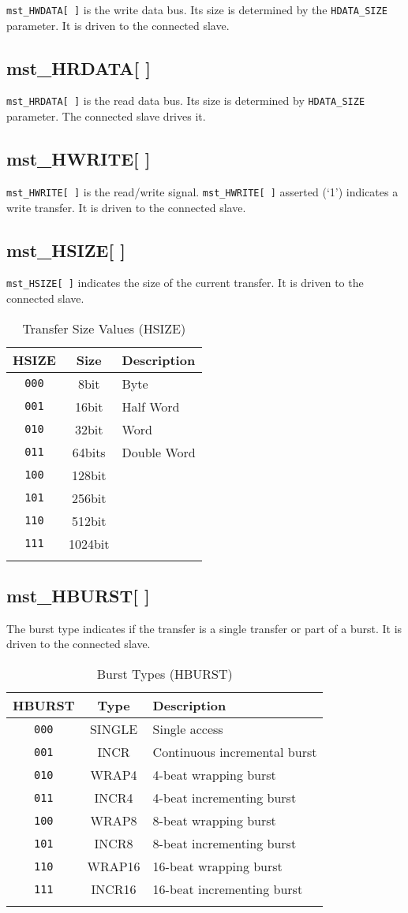 \texttt{mst\_HWDATA[\,]} is the write data bus. Its size is determined by the
\texttt{HDATA\_SIZE} parameter. It is driven to the connected slave.

\subsection{mst\_HRDATA[ ]}\label{mst_hrdata}

\texttt{mst\_HRDATA[\,]} is the read data bus. Its size is determined by \texttt{HDATA\_SIZE}
parameter. The connected slave drives it.

\subsection{mst\_HWRITE[ ]}\label{mst_hwrite}

\texttt{mst\_HWRITE[\,]} is the read/write signal. \texttt{mst\_HWRITE[\,]} asserted (`1') indicates a
write transfer. It is driven to the connected slave.

\subsection{mst\_HSIZE[ ]}\label{mst_hsize}

\texttt{mst\_HSIZE[\,]} indicates the size of the current transfer. It is driven to
the connected slave.

\begin{longtable}[]{@{}ccl@{}}
\toprule
HSIZE & Size & Description\tabularnewline
\midrule
\endhead
\texttt{000} & 8bit    & Byte\tabularnewline
\texttt{001} & 16bit   & Half Word\tabularnewline
\texttt{010} & 32bit   & Word\tabularnewline
\texttt{011} & 64bits  & Double Word\tabularnewline
\texttt{100} & 128bit  & \tabularnewline
\texttt{101} & 256bit  & \tabularnewline
\texttt{110} & 512bit  & \tabularnewline
\texttt{111} & 1024bit & \tabularnewline
\bottomrule
\caption{Transfer Size Values (HSIZE)}
\end{longtable}


\subsection{mst\_HBURST[ ]}\label{mst_hburst}

The burst type indicates if the transfer is a single transfer or part of
a burst. It is driven to the connected slave.

\begin{longtable}[]{@{}ccl@{}}
\toprule
HBURST & Type & Description\tabularnewline
\midrule
\endhead
\texttt{000} & SINGLE & Single access\tabularnewline
\texttt{001} & INCR & Continuous incremental burst\tabularnewline
\texttt{010} & WRAP4 & 4-beat wrapping burst\tabularnewline
\texttt{011} & INCR4 & 4-beat incrementing burst\tabularnewline
\texttt{100} & WRAP8 & 8-beat wrapping burst\tabularnewline
\texttt{101} & INCR8 & 8-beat incrementing burst\tabularnewline
\texttt{110} & WRAP16 & 16-beat wrapping burst\tabularnewline
\texttt{111} & INCR16 & 16-beat incrementing burst\tabularnewline
\bottomrule
\caption{Burst Types (HBURST)}
\end{longtable}

